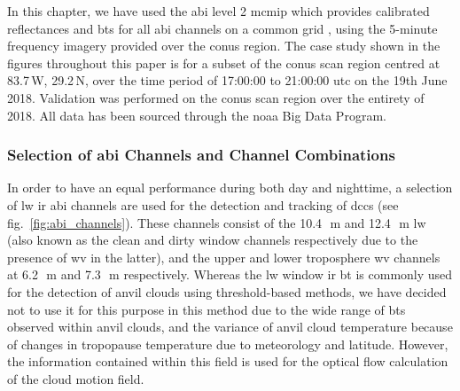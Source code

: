 In this chapter, we have used the \acrshort{abi} level 2 \acrfull{mcmip} which provides calibrated reflectances and \acrshort{bt}s for all \acrshort{abi} channels on a common grid \citep{schmit_chapter_2020}, using the 5-minute frequency imagery provided over the \acrshort{conus} region.
The case study shown in the figures throughout this paper is for a subset of the \acrshort{conus} scan region centred at 83.7\,\textdegree W, 29.2\,\textdegree N, over the time period of 17:00:00 to 21:00:00 \acrshort{utc} on the 19th June 2018.
Validation was performed on the \acrshort{conus} scan region over the entirety of 2018.
All data has been sourced through the \acrshort{noaa} Big Data Program.



\subsubsection{Selection of \acrshort{abi} Channels and Channel Combinations}

In order to have an equal performance during both day and nighttime, a selection of \acrshort{lw} \acrshort{ir} \acrshort{abi} channels are used for the detection and tracking of \acrshort{dcc}s (see fig.~\ref{fig:abi_channels}). 
These channels consist of the 10.4\,\unit{\mu m} and 12.4\,\unit{\mu m} \acrshort{lw} (also known as the clean and dirty window channels respectively due to the presence of \acrshort{wv} in the latter), and the upper and lower troposphere \acrshort{wv} channels at 6.2\,\unit{\mu m} and 7.3\,\unit{\mu m} respectively.
Whereas the \acrshort{lw} window \acrshort{ir} \acrshort{bt} is commonly used for the detection of anvil clouds using threshold-based methods, we have decided not to use it for this purpose in this method due to the wide range of \acrshort{bt}s observed within anvil clouds, and the variance of anvil cloud temperature because of changes in tropopause temperature due to meteorology and latitude.
However, the information contained within this field is used for the optical flow calculation of the cloud motion field.


